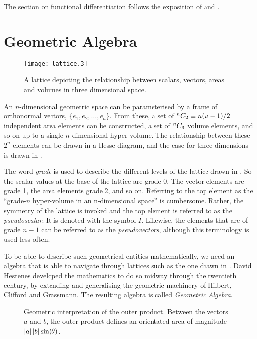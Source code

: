 The section on functional differentiation follows the exposition of \cite{AltlandBook, Doran2003} and
\cite{ FramptonBook}.

\section{Geometric Algebra}


\begin{figure}%
 \centering
 \texttt{[image: lattice.3]}
 \caption{
   A lattice depicting the relationship between scalars, vectors, areas and volumes in three dimensional space.
}
 \label{fig:lattice_3D}
\end{figure}


An $n$-dimensional geometric space can be parameterised by a frame of orthonormal vectors, $\{e_1,e_2,\ldots, e_n\}$.
From these, a set of ${}^{n}C_{2} \equiv n(n-1)/2$ independent area elements can be constructed,
 a set of ${}^{n}C_{3}$ volume elements,
and so on up to a single $n$-dimensional hyper-volume.
The relationship between these $2^n$ elements can be drawn in a Hesse-diagram,
and the case for three dimensions is drawn in .

The word {\em grade} is used to describe the different levels of the lattice drawn in .
So the scalar values at the base of the lattice are grade 0.
The vector elements are grade 1, the area elements grade 2, and so on.
Referring to the top element as the ``grade-$n$ hyper-volume in an n-dimensional space'' is cumbersome.
Rather, the symmetry of the lattice is invoked and the top element is referred to as the {\em pseudoscalar}. 
It is denoted with the symbol $I$.
Likewise, the elements that are of grade $n-1$ can be referred to as the {\em pseudovectors}, although this terminology is used less often.

To be able to describe such geometrical entities mathematically, 
we need an algebra that is able to navigate through lattices such as the one drawn in .
David Hestenes developed the mathematics to do so midway through the twentieth century,
by extending and generalising the geometric machinery of Hilbert, Clifford and Grassmann.
The resulting algebra is called {\em Geometric Algebra}.


\begin{figure}%
 \centering
{}
 \caption{
   Geometric interpretation of the outer product.
   Between the vectors $a$ and $b$,
   the outer product defines an orientated area of magnitude $\left| a \right|\left| b \right|\sin(\theta)$.
}
 \label{fig:outer_product}
\end{figure}

